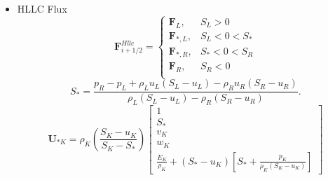 \documentclass{book}
\begin{document}
\begin{itemize}
          \begin{equation}
              \mathbf{F}_{i+1 / 2}^{H l l}=\begin{cases}
                  \mathbf{F}_{L},     & S_{L}  \geq 0 \\
                  \mathbf{F}^{H l l}, & S_{L}<0<S_{R} \\
                  \mathbf{F}_{R},     & S_{R}  \leq 0
              \end{cases}
          \end{equation}
          \begin{equation}
              \mathbf{F}^{H l l}=\frac{S_{R} \mathbf{F}_{L}-S_{L} \mathbf{F}_{R}+S_{L} S_{R}\left(\mathbf{U}_{R}-\mathbf{U}_{L}\right)}{S_{R}-S_{L}}
          \end{equation}
    \item HLLC Flux
          \begin{equation}
              \mathbf{F}_{i+1/2}^{Hllc}=\begin{cases}
                  \mathbf{F}_L,     & S_L>0     \\
                  \mathbf{F}_{*,L}, & S_L<0<S_* \\
                  \mathbf{F}_{*,R}, & S_*<0<S_R \\
                  \mathbf{F}_R,     & S_R<0     \\
              \end{cases}
          \end{equation}
          \begin{equation}
              S_{*}=\frac{p_{R}-p_{L}+\rho_{L} u_{L}\left(S_{L}-u_{L}\right)-\rho_{R} u_{R}\left(S_{R}-u_{R}\right)}{\rho_{L}\left(S_{L}-u_{L}\right)-\rho_{R}\left(S_{R}-u_{R}\right)} .
          \end{equation}
          \begin{equation}
              \mathbf{U}_{* K}=\rho_{K}\left(\frac{S_{K}-u_{K}}{S_{K}-S_{*}}\right)\begin{bmatrix}
                  1     \\
                  S_{*} \\
                  v_{K} \\
                  w_{K} \\
                  \frac{E_{K}}{\rho_{K}}+\left(S_{*}-u_{K}\right)\left[S_{*}+\frac{p_{K}}{\rho_{K}\left(S_{K}-u_{K}\right)}\right]
              \end{bmatrix}
          \end{equation}

\end{itemize}
\end{document}
